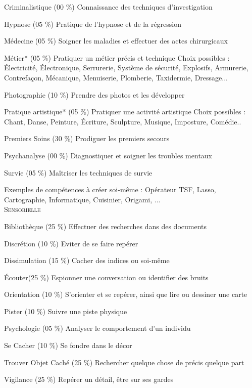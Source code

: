 \documentclass[11pt,twoside,a4paper]{article}
\begin{document}
\begin{multicols*}{2}
	Criminalistique (00 \%)
	Connaissance des techniques d'investigation
	
	Hypnose (05 \%)
	Pratique de l'hypnose et de la r{\'e}gression
	
	M{\'e}decine (05 \%)
	Soigner les maladies et effectuer des actes chirurgicaux
	
	M{\'e}tier* (05 \%)
	Pratiquer un m{\'e}tier pr{\'e}cis et technique
	Choix possibles : {\'E}lectricit{\'e}, {\'E}lectronique, Serrurerie, Syst{\`e}me de s{\'e}curit{\'e}, Explosifs, Armurerie, Contrefa\c{c}on, M{\'e}canique, Menuiserie, Plomberie, Taxidermie, Dressage...
	
	Photographie (10 \%)
	Prendre des photos et les d{\'e}velopper
	
	Pratique artistique* (05 \%)
	Pratiquer une activit{\'e} artistique
	Choix possibles : Chant, Danse, Peinture, {\'E}criture, Sculpture, Musique, Imposture, Com{\'e}die..
	
	Premiers Soins (30 \%)
	Prodiguer les premiers secours
	
	Psychanalyse (00 \%)
	Diagnostiquer et soigner les troubles mentaux
	
	Survie (05 \%)
	Ma{\^i}triser les techniques de survie
	
	Exemples de comp{\'e}tences {\`a} cr{\'e}er soi-m{\^e}me : 
	Op{\'e}rateur TSF, Lasso, Cartographie, Informatique, Cuisinier, Origami, ... ~\\

\textsc{Sensorielle}

	Biblioth{\`e}que (25 \%)
	Effectuer des recherches dans des documents
	
	Discr{\'e}tion (10 \%)
	Eviter de se faire rep{\'e}rer
	
	Dissimulation (15 \%)
	Cacher des indices ou soi-m{\^e}me
	
	{\'E}couter(25 \%)
	Espionner une conversation ou identifier des bruits
	
	Orientation (10 \%)
	S'orienter et se rep{\'e}rer, ainsi que lire ou dessiner une carte
	
	Pister (10 \%)
	Suivre une piste physique
	
	Psychologie (05 \%)
	Analyser le comportement d'un individu
	
	Se Cacher (10 \%)
	Se fondre dans le d{\'e}cor
	
	Trouver Objet Cach{\'e} (25 \%)
	Rechercher quelque chose de pr{\'e}cis quelque part
	
	Vigilance (25 \%)
	Rep{\'e}rer un d{\'e}tail, {\^e}tre sur ses gardes
	

\end{multicols*}
\end{document}
